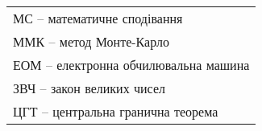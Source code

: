 
\begin{tabular}{l}
	МС -- математичне сподівання \\
	ММК -- метод Монте-Карло \\
	ЕОМ -- електронна обчилювальна машина \\
	ЗВЧ -- закон великих чисел \\
	ЦГТ -- центральна гранична теорема
\end{tabular}